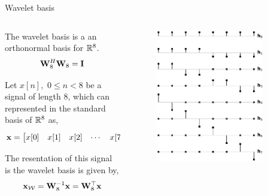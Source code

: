 \documentclass[aspectratio=169]{beamer}
\def\mf{\ensuremath\mathbf}
\def\mb{\ensuremath\mathbb}
\def\mc{\ensuremath\mathcal}
\def\bmx{\ensuremath\begin{bmatrix*}[r]}
\def\emx{\ensuremath\end{bmatrix*}}
\begin{document}
\begin{frame}[t]{Wavelet basis}
  \begin{columns}[T]
    \begin{column}{0.45\textwidth}
      The wavelet basis is a an orthonormal basis for $\mb{R}^8$.
      \[  \mf{W}_8^H \mf{W}_8 = \mf{I} \]

      Let $x[n], \,\, 0 \leq n < 8$ be a signal of length $8$, which can represented in the standard basis of $\mb{R}^8$ as,
      \[ \mf{x} = \bmx x[0] & x[1] & x[2] & \cdots & x[7] \emx^\top \]

      The resentation of this signal is the wavelet basis is given by,
      \[ \mf{x}_{\mc{W}} = \mf{W}_8^{-1} \mf{x} = \mf{W}_8^{\top} \mf{x}\]

    \end{column}
    \begin{column}{0.52\textwidth}
      \vspace{-1cm}
      \begin{figure}[t]
        \includegraphics[width=0.85\textwidth]{figs/haar_vectors.eps}
      \end{figure}
    \end{column}
  \end{columns}
\end{frame}
\end{document}
